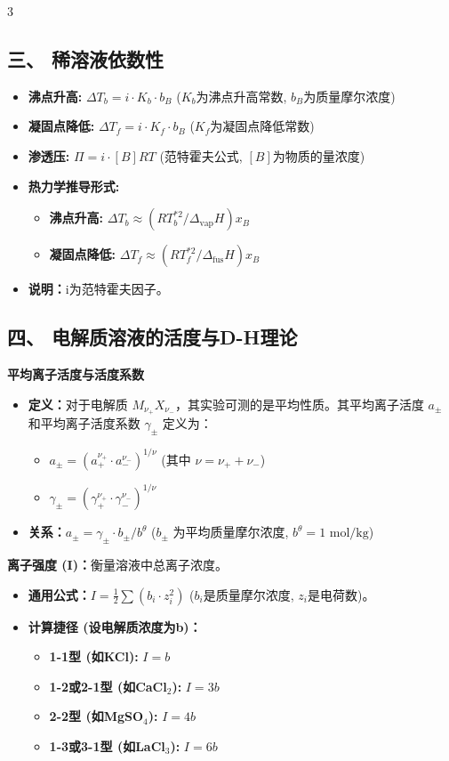 \documentclass[a4paper,6pt]{article} %
\begin{document}
\begin{multicols}{3}
\subsection*{三、 稀溶液依数性}
\begin{itemize}
    \item \textbf{沸点升高:} $\Delta T_b = i \cdot K_b \cdot b_B$ ($K_b$为沸点升高常数, $b_B$为质量摩尔浓度)
    \item \textbf{凝固点降低:} $\Delta T_f = i \cdot K_f \cdot b_B$ ($K_f$为凝固点降低常数)
    \item \textbf{渗透压:} $\Pi = i \cdot [B] RT$ (范特霍夫公式, $[B]$为物质的量浓度)
    \item \textbf{热力学推导形式:}
    \begin{itemize}
        \item \textbf{沸点升高:} $\Delta T_b \approx (RT_b^{*2}/\Delta_{\text{vap}}H) x_B$
        \item \textbf{凝固点降低:} $\Delta T_f \approx (RT_f^{*2}/\Delta_{\text{fus}}H) x_B$
    \end{itemize}
    \item \textbf{说明：}i为范特霍夫因子。
\end{itemize}

\subsection*{四、 电解质溶液的活度与D-H理论}
\textbf{平均离子活度与活度系数}
\begin{itemize}
    \item \textbf{定义：}对于电解质 $M_{\nu_+}X_{\nu_-}$，其实验可测的是平均性质。其平均离子活度 $a_{\pm}$ 和平均离子活度系数 $\gamma_{\pm}$ 定义为：
    \begin{itemize}
        \item $a_\pm = (a_+^{\nu_+} \cdot a_-^{\nu_-})^{1/\nu}$ (其中 $\nu = \nu_+ + \nu_-$)
        \item $\gamma_\pm = (\gamma_+^{\nu_+} \cdot \gamma_-^{\nu_-})^{1/\nu}$
    \end{itemize}
    \item \textbf{关系：}$a_\pm = \gamma_\pm \cdot b_\pm / b^\theta$ ($b_\pm$ 为平均质量摩尔浓度, $b^\theta = 1 \text{ mol/kg}$)
\end{itemize}

\textbf{离子强度 (I)：}衡量溶液中总离子浓度。
\begin{itemize}
    \item \textbf{通用公式：}$I = \frac{1}{2} \sum(b_i \cdot z_i^2)$ ($b_i$是质量摩尔浓度, $z_i$是电荷数)。
    \item \textbf{计算捷径 (设电解质浓度为b)：}
    \begin{itemize}
        \item \textbf{1-1型 (如KCl):} $I = b$
        \item \textbf{1-2或2-1型 (如CaCl$_2$):} $I = 3b$
        \item \textbf{2-2型 (如MgSO$_4$):} $I = 4b$
        \item \textbf{1-3或3-1型 (如LaCl$_3$):} $I = 6b$
    \end{itemize}
\end{itemize}


\end{multicols}
\end{document}
